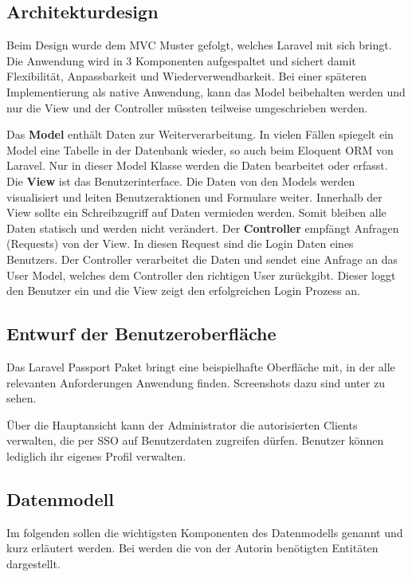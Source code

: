 \subsection{Architekturdesign}
\label{sec:Architekturdesign}

Beim Design wurde dem \ac{MVC} Muster gefolgt, welches Laravel mit sich bringt. Die Anwendung wird in 3 Komponenten aufgespaltet und sichert damit Flexibilität, Anpassbarkeit und Wiederverwendbarkeit.
Bei einer späteren Implementierung als native Anwendung, kann das Model beibehalten werden und nur die View und der Controller müssten teilweise umgeschrieben werden.

Das \textbf{Model} enthält Daten zur Weiterverarbeitung. In vielen Fällen spiegelt ein Model eine Tabelle in der Datenbank wieder, so auch beim Eloquent \ac{ORM} von Laravel. Nur in dieser Model Klasse werden die Daten bearbeitet oder erfasst. 
Die \textbf{View} ist das Benutzerinterface. Die Daten von den Models werden visualisiert und leiten \zB Benutzeraktionen und Formulare weiter. Innerhalb der View sollte ein Schreibzugriff auf Daten vermieden werden. Somit bleiben alle Daten statisch und werden nicht verändert.
Der \textbf{Controller} empfängt Anfragen (Requests) von der View. In diesen Request sind \bspw die Login Daten eines Benutzers. Der Controller verarbeitet die Daten und sendet eine Anfrage an das User Model, welches dem Controller den richtigen User zurückgibt. Dieser loggt den Benutzer ein und die View zeigt den erfolgreichen Login Prozess an. 

\subsection{Entwurf der Benutzeroberfläche}
\label{sec:Benutzeroberflaeche} 

Das Laravel Passport Paket bringt eine beispielhafte Oberfläche mit, in der alle relevanten Anforderungen Anwendung finden. Screenshots dazu sind unter  zu sehen.

Über die Hauptansicht kann der Administrator die autorisierten Clients verwalten, die per \ac{SSO} auf  Benutzerdaten zugreifen dürfen. Benutzer können lediglich ihr eigenes Profil verwalten.

\subsection{Datenmodell}
\label{sec:Datenmodell}

Im folgenden sollen die wichtigsten Komponenten des Datenmodells genannt und kurz erläutert werden. Bei  werden die von der Autorin benötigten Entitäten dargestellt. 

